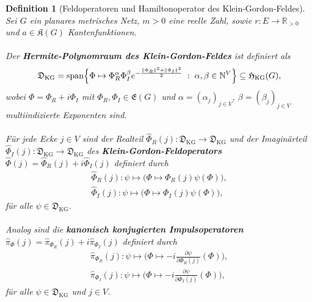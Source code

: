\documentclass[11pt,a4paper,leqno]{report}
\newtheorem{definition}[theorem]{Definition}
\numberwithin{equation}{chapter}
\begin{document}
\begin{definition}[Feldoperatoren und Hamiltonoperator des Klein-Gordon-Feldes]
	\label{def:KG-Feldoperatoren}
	Sei $G$ ein planares metrisches Netz, $m>0$ eine reelle Zahl, 
	sowie $r:E\to\mathbb R_{>0}$ und $a\in\mathfrak K(G)$ Kantenfunktionen.  
	\\
	\\
	Der \textbf{Hermite-Polynomraum des Klein-Gordon-Feldes} ist definiert als
	\begin{equation}
		\mathfrak D_{\mathrm{KG}}
		=
		\operatorname{span}\Bigl\{
		\Phi\mapsto
		\Phi_R^\alpha\Phi_I^\beta
		e^{-\frac{\|\Phi_R\|^2+\|\Phi_I\|^2}{2}}
		\;:\;
		\alpha,\beta\in\mathbb N^V
		\Bigr\}
		\subseteq
		\mathfrak H_{\mathrm{KG}}(G),
		\label{eq:KG-Hermite-Raum}
	\end{equation}
	wobei $\Phi=\Phi_R+i\Phi_I$ mit $\Phi_R,\Phi_I\in\mathfrak E(G)$ 
	und $\alpha=(\alpha_j)_{j\in V}$, $\beta=(\beta_j)_{j\in V}$ 
	multiindizierte Exponenten sind.\\
	\\
	Für jede Ecke $j\in V$ sind der Realteil
	$\hat\Phi_R(j):\mathfrak D_{\mathrm{KG}}\to\mathfrak D_{\mathrm{KG}}$
	und der Imaginärteil
	$\hat\Phi_I(j):\mathfrak D_{\mathrm{KG}}\to\mathfrak D_{\mathrm{KG}}$
	des \textbf{Klein-Gordon-Feldoperators}
	$\hat\Phi(j)=\hat\Phi_R(j)+i\hat\Phi_I(j)$
	definiert durch
	\begin{align}
		\hat\Phi_R(j):\psi
		\longmapsto
		\bigl(\Phi\mapsto\Phi_R(j)\psi(\Phi)\bigr),
		\label{eq:KG-PhiR-op}\\
		\hat\Phi_I(j):\psi
		\longmapsto
		\bigl(\Phi\mapsto\Phi_I(j)\psi(\Phi)\bigr),
		\label{eq:KG-PhiI-op}
	\end{align}
	für alle $\psi\in\mathfrak D_{\mathrm{KG}}$.\\
	\\
	Analog sind die \textbf{kanonisch konjugierten Impulsoperatoren}
	$\hat\pi_\Phi(j)=\hat\pi_{\Phi_R}(j)+i\hat\pi_{\Phi_I}(j)$
	definiert durch
	\begin{align}
		\hat\pi_{\Phi_R}(j):\psi
		\longmapsto
		\bigl(\Phi\mapsto
		-i\frac{\partial\psi}{\partial\Phi_R(j)}(\Phi)\bigr),
		\label{eq:KG-piR-op}\\
		\hat\pi_{\Phi_I}(j):\psi
		\longmapsto
		\bigl(\Phi\mapsto
		-i\frac{\partial\psi}{\partial\Phi_I(j)}(\Phi)\bigr),
		\label{eq:KG-piI-op}
	\end{align}
	für alle $\psi\in\mathfrak D_{\mathrm{KG}}$ und $j\in V$.\\
	\\

\end{definition}
\end{document}
